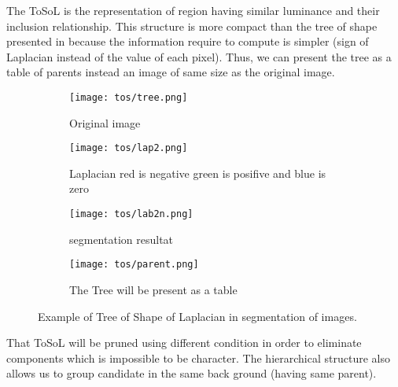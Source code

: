 \par
The ToSoL is the representation of region having similar luminance and their inclusion relationship. This structure is more compact than the tree of shape presented in \cite{geraud.13.ismm} because the information require to compute is simpler (sign of Laplacian instead of the value of each pixel). Thus, we can present the tree as a table of parents instead an image of same size as the original image. 

\begin{figure}
	\centering
	\begin{subfigure}[t]{2in}
		\centering
	 	\texttt{[image: tos/tree.png]} \caption{Original image}\label{fig:tosOri} \end{subfigure}   
	\begin{subfigure}[t]{2in}
		\centering
	 	\texttt{[image: tos/lap2.png]} \caption{Laplacian red is negative green is posifive and blue is zero}\label{fig:tosLap} \end{subfigure}   
	\begin{subfigure}[t]{2in}
		\centering
		\texttt{[image: tos/lab2n.png]} \caption{segmentation resultat}\label{fig:tosLab} \end{subfigure}
	\centering
		
	\begin{subfigure}[t]{2in}
		\centering
		\texttt{[image: tos/parent.png]} 
		\caption{The Tree will be present as a table}\label{fig:tosParent} \end{subfigure}					
	\centering
	\caption[Example of \textit{Tree of Shape of Laplacian}] {Example of Tree of Shape of Laplacian in segmentation of images.  }
	\label{fig:binOperations}
\end{figure}

\par That ToSoL will be pruned using different condition in order to eliminate components which is impossible to be character. The hierarchical structure also allows us to group candidate in the same back ground (having same parent).


